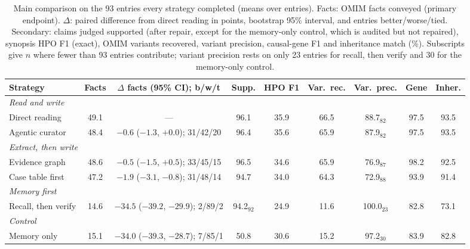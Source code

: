\documentclass{article} %
\begin{document}
\begin{table}[t]
\caption{Main comparison on the 93 entries every strategy completed (means over entries). Facts: OMIM facts conveyed (primary endpoint). $\Delta$: paired difference from direct reading in points, bootstrap 95\% interval, and entries better/worse/tied. Secondary: claims judged supported (after repair, except for the memory-only control, which is audited but not repaired), synopsis HPO F1 (exact), OMIM variants recovered, variant precision, causal-gene F1 and inheritance match (\%). Subscripts give $n$ where fewer than 93 entries contribute; variant precision rests on only 23 entries for recall, then verify and 30 for the memory-only control.}
\label{tab:main}
\begin{center}
\footnotesize
\setlength{\tabcolsep}{2.2pt}
\begin{tabular}{lcccccccc}
\toprule
Strategy & Facts & $\Delta$ facts (95\% CI); b/w/t & Supp. & HPO F1 & Var.\ rec. & Var.\ prec. & Gene & Inher. \\
\midrule
\multicolumn{9}{l}{\emph{Read and write}} \\
Direct reading & 49.1 & --- & 96.1 & 35.9 & 66.5 & 88.7$_{82}$ & 97.5 & 93.5 \\
Agentic curator & 48.4 & $-0.6$ ($-1.3$, $+0.0$); 31/42/20 & 96.4 & 35.6 & 65.9 & 87.9$_{82}$ & 97.5 & 93.5 \\
\multicolumn{9}{l}{\emph{Extract, then write}} \\
Evidence graph & 48.6 & $-0.5$ ($-1.5$, $+0.5$); 33/45/15 & 96.5 & 34.6 & 65.9 & 76.9$_{87}$ & 98.2 & 92.5 \\
Case table first & 47.2 & $-1.9$ ($-3.1$, $-0.8$); 31/48/14 & 94.7 & 34.0 & 64.3 & 72.9$_{88}$ & 93.9 & 91.4 \\
\multicolumn{9}{l}{\emph{Memory first}} \\
Recall, then verify & 14.6 & $-34.5$ ($-39.2$, $-29.9$); 2/89/2 & 94.2$_{92}$ & 24.9 & 11.6 & 100.0$_{23}$ & 82.8 & 73.1 \\
\multicolumn{9}{l}{\emph{Control}} \\
Memory only & 15.1 & $-34.0$ ($-39.3$, $-28.7$); 7/85/1 & 50.8 & 30.6 & 15.2 & 97.2$_{30}$ & 83.9 & 82.8 \\
\bottomrule
\end{tabular}
\end{center}
\end{table}
\end{document}
